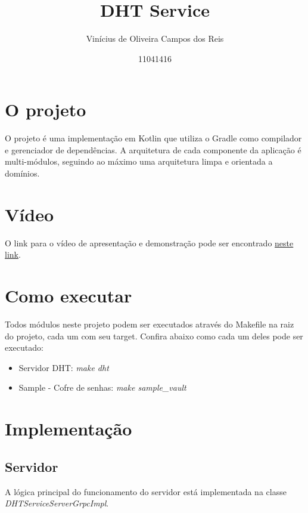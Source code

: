 \documentclass{article}
\title{DHT Service}
\author{Vinícius de Oliveira Campos dos Reis
\and 11041416}
\date{}
\begin{document}
    \maketitle

    \section{O projeto}\label{sec:introducao}

    O projeto é uma implementação em Kotlin que utiliza o Gradle como compilador e gerenciador de dependências.
    A arquitetura de cada componente da aplicação é multi-módulos, seguindo ao máximo uma arquitetura limpa e orientada a domínios.

    \section{Vídeo}\label{sec:video}

    O link para o vídeo de apresentação e demonstração pode ser encontrado \href{}{neste link}.

    \section{Como executar}\label{sec:como-executar}

    Todos módulos neste projeto podem ser executados através do Makefile na raiz do projeto, cada um com seu target.
    Confira abaixo como cada um deles pode ser executado:

    \begin{itemize}
        \item Servidor DHT: \textit{make dht}
        \item Sample - Cofre de senhas: \textit{make sample\_vault}
    \end{itemize}

    \section{Implementação}\label{sec:implementacao}

    \subsection{Servidor}\label{subsec:server}

    A lógica principal do funcionamento do servidor está implementada na classe \textit{DHTServiceServerGrpcImpl}.
\end{document}
